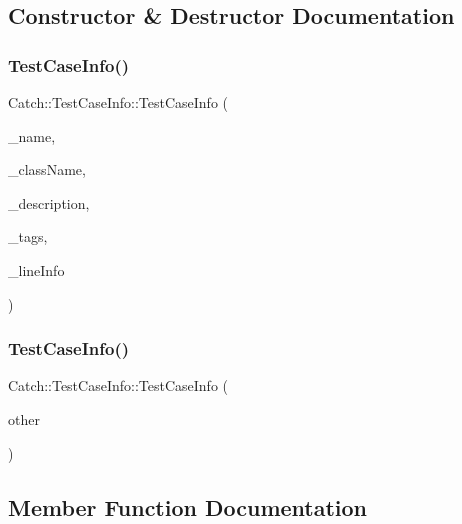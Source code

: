\subsection{Constructor \& Destructor Documentation}
\mbox{\label{struct_catch_1_1_test_case_info_a35ec65315e0d1f178491b5a59f3f3123}} 
\subsubsection{Test\+Case\+Info()\hspace{0.1cm}{\footnotesize\ttfamily [1/2]}}
{\footnotesize\ttfamily Catch\+::\+Test\+Case\+Info\+::\+Test\+Case\+Info (\begin{DoxyParamCaption}\item[{std\+::string const \&}]{\+\_\+name,  }\item[{std\+::string const \&}]{\+\_\+class\+Name,  }\item[{std\+::string const \&}]{\+\_\+description,  }\item[{std\+::set$<$ std\+::string $>$ const \&}]{\+\_\+tags,  }\item[{\textbf{ Source\+Line\+Info} const \&}]{\+\_\+line\+Info }\end{DoxyParamCaption})}

\mbox{\label{struct_catch_1_1_test_case_info_ac338adb4e38f4bf3977fb45b2b1fe447}} 
\subsubsection{Test\+Case\+Info()\hspace{0.1cm}{\footnotesize\ttfamily [2/2]}}
{\footnotesize\ttfamily Catch\+::\+Test\+Case\+Info\+::\+Test\+Case\+Info (\begin{DoxyParamCaption}\item[{\textbf{ Test\+Case\+Info} const \&}]{other }\end{DoxyParamCaption})}



\subsection{Member Function Documentation}
\mbox{\label{struct_catch_1_1_test_case_info_abe33d81233230cdae8afa714688e905b}} 

